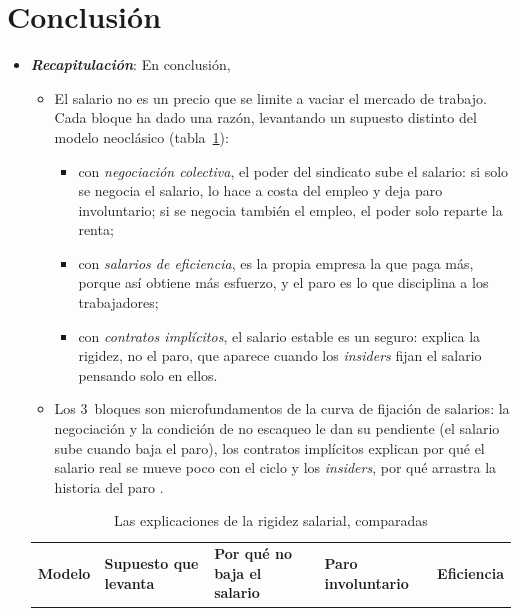 \documentclass[11pt]{article}
\begin{document}
\section*{Conclusión}

\begin{itemize}
\item \textbf{\emph{Recapitulación}}: En conclusión,
  \begin{itemize}
  \item El salario no es un precio que se limite a vaciar el mercado de trabajo. Cada bloque ha dado una razón, levantando un supuesto distinto del modelo neoclásico (tabla~\ref{tab:resumen-salarios}):
    \begin{itemize}
    \item con \emph{negociación colectiva}, el poder del sindicato sube el salario: si solo se negocia el salario, lo hace a costa del empleo y deja paro involuntario; si se negocia también el empleo, el poder solo reparte la renta;
    \item con \emph{salarios de eficiencia}, es la propia empresa la que paga más, porque así obtiene más esfuerzo, y el paro es lo que disciplina a los trabajadores;
    \item con \emph{contratos implícitos}, el salario estable es un seguro: explica la rigidez, no el paro, que aparece cuando los \emph{insiders} fijan el salario pensando solo en ellos.
    \end{itemize}
  \item Los 3~bloques son microfundamentos de la curva de fijación de salarios: la negociación y la condición de no escaqueo le dan su pendiente (el salario sube cuando baja el paro), los contratos implícitos explican por qué el salario real se mueve poco con el ciclo y los \emph{insiders}, por qué arrastra la historia del paro .
  \end{itemize}
  \begin{table}[H]
  \centering
  \caption{Las explicaciones de la rigidez salarial, comparadas}\label{tab:resumen-salarios}
  \small
  \begin{tabular}{>{\raggedright\arraybackslash}m{3.3cm}>{\centering\arraybackslash}m{2.5cm}>{\centering\arraybackslash}m{3.1cm}>{\centering\arraybackslash}m{2.2cm}>{\centering\arraybackslash}m{2.3cm}}
  \toprule
  \rowcolor{tceeazulpalido}\textbf{Modelo} & \textbf{Supuesto que levanta} & \textbf{Por qué no baja el salario} & \textbf{Paro involuntario} & \textbf{Eficiencia}\\

\end{tabular}
\end{table}
\end{itemize}
\end{document}
